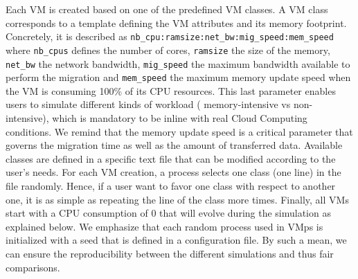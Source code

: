 \documentclass[conference]{IEEEtran}
\newcommand{\vmps}{VMps\xspace}
\begin{document}
Each VM is created based on one of the predefined VM classes. A VM
class corresponds to a template defining the VM attributes and its
memory footprint. Concretely, it is described as
\texttt{nb\_cpu:ramsize:net\_bw:mig\_speed:mem\_speed} where
\texttt{nb\_cpus} defines the number of cores, \texttt{ramsize} the
size of the memory, \texttt{net\_bw} the network bandwidth,
\texttt{mig\_speed} the maximum bandwidth available to perform the
migration and \texttt{mem\_speed} the maximum memory update speed when
the VM is consuming 100\% of its CPU resources. This last parameter
enables users to simulate different kinds of workload (\ie
memory-intensive vs non-intensive), which is mandatory to be inline
with real Cloud Computing conditions. We remind that the memory update
speed is a critical parameter that governs the migration time as well
as the amount of transferred data. Available classes are defined in a
specific text file that can be modified according to the user's needs.
For each VM creation, a process selects one class (\ie one line) in
the file randomly. Hence, if a user want to favor one class with
respect to another one, it is as simple as repeating the line of the
class more times. Finally, all VMs start with a CPU consumption of 0
that will evolve during the simulation as explained below.
We emphasize that each random process used in \vmps is initialized with a seed
that is defined in a configuration file. By such a mean, we can ensure
the reproducibility between the different simulations and thus fair
comparisons.
\end{document}
